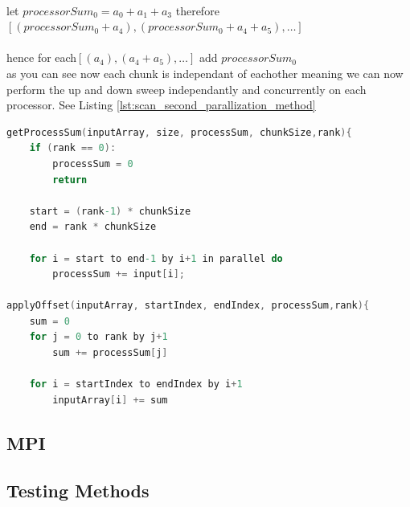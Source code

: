 \\let $processorSum_0 = a_0+a_1+a_3$ therefore\\
$[(processorSum_0+a_4),(processorSum_0 + a_4 +a_5),\dots] $\\\\hence for each$ [(a_4),(a_4 +a_5),\dots]$ add $processorSum_0$\\
as you can see now each chunk is independant of eachother meaning we can now perform the up and down sweep independantly and concurrently on each processor. See Listing \ref{lst:scan_second_parallization_method} 
\begin{lstlisting}[language=C, caption={Serial Sequenctial Scan Algorithm with + operator}, label={lst:scan_second_parallization_method}]
getProcessSum(inputArray, size, processSum, chunkSize,rank){ 
	if (rank == 0):  
		processSum = 0 
		return 
	 
	start = (rank-1) * chunkSize 
	end = rank * chunkSize
	
	for i = start to end-1 by i+1 in parallel do
		processSum += input[i];
	 
applyOffset(inputArray, startIndex, endIndex, processSum,rank){ 
	sum = 0 
	for j = 0 to rank by j+1
		sum += processSum[j] 
		
	for i = startIndex to endIndex by i+1
		inputArray[i] += sum
\end{lstlisting}
\subsection{MPI}
\subsection{Testing Methods}


